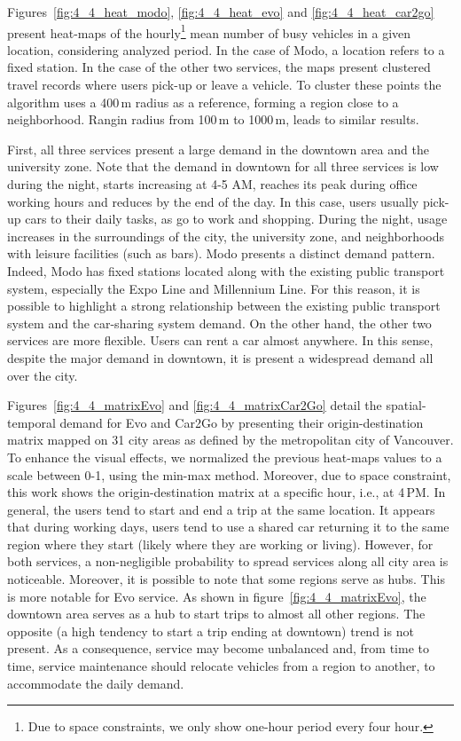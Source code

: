 Figures~\ref{fig:4_4_heat_modo}, \ref{fig:4_4_heat_evo} and \ref{fig:4_4_heat_car2go} present heat-maps of the hourly\footnote{Due to space constraints, we only show one-hour period every four hour.} mean number of busy vehicles in a given location, considering analyzed period. In the case of Modo, a location refers to a fixed station. In the case of the other two services, the maps present clustered travel records where users pick-up or leave a vehicle. To cluster these points the algorithm uses a 400\,m radius as a reference, forming a region close to a neighborhood. Rangin radius from 100\,m to 1000\,m, leads to similar results. 

First, all three services present a large demand in the downtown area and the university zone. Note that the demand in downtown for all three services is low during the night, starts increasing at 4-5 AM, reaches its peak during office working hours and reduces by the end of the day. In this case, users usually pick-up cars to their daily tasks, as go to work and shopping. During the night, usage increases in the surroundings of the city, the university zone, and neighborhoods with leisure facilities (such as bars). 
Modo presents a distinct demand pattern. Indeed, Modo has fixed stations located along with the existing public transport system, especially the Expo Line and Millennium Line. For this reason, it is possible to highlight a strong relationship between the existing public transport system and the car-sharing system demand. On the other hand, the other two services are more flexible. Users can rent a car almost anywhere. In this sense, despite the major demand in downtown, it is present a widespread demand all over the city.

Figures~\ref{fig:4_4_matrixEvo} and \ref{fig:4_4_matrixCar2Go} detail the spatial-temporal demand for Evo and Car2Go by presenting their origin-destination matrix mapped on 31 city areas as defined by the metropolitan city of Vancouver. To enhance the visual effects, we normalized the previous heat-maps values to a scale between 0-1, using the min-max method. Moreover, due to space constraint, this work shows the origin-destination matrix at a specific hour, i.e., at 4\,PM.
In general, the users tend to start and end a trip at the same location. It appears that during working days, users tend to use a shared car  returning it to the same region where they start (likely where they are working or living). However, for both services, a non-negligible probability to spread services along all city area is noticeable. 
Moreover, it is possible to note that some regions serve as hubs. This is more notable for Evo service. As shown in figure~\ref{fig:4_4_matrixEvo}, the downtown area serves as a hub to start trips to almost all other regions. The opposite (a high tendency to start a trip ending at downtown) trend is not present. As a consequence, service may become unbalanced and, from time to time, service maintenance should relocate vehicles from a region to another, to accommodate the daily demand.

